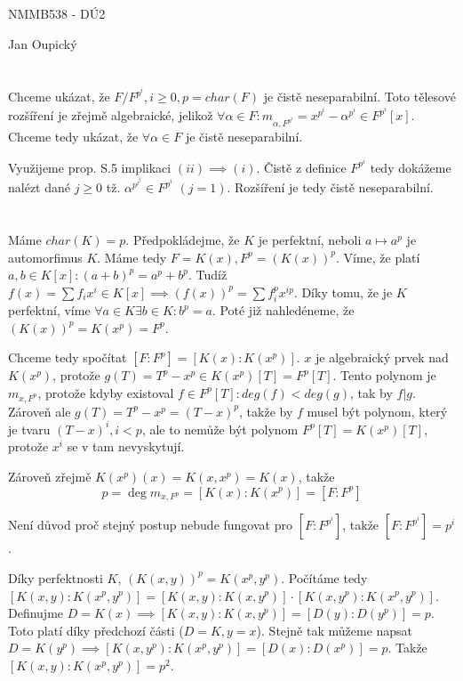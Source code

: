 \documentclass[12pt, a4paper]{article}
\begin{document}
\begin{center}
\large NMMB538 - DÚ2

\normalsize Jan Oupický
\end{center}
\vspace{1\baselineskip}

\section{}
Chceme ukázat, že $F/F^{p^i}, i \geq 0, p = char(F)$ je čistě neseparabilní. Toto tělesové rozšíření je zřejmě algebraické, jelikož $\forall \alpha \in F: m_{\alpha,F^{p^i}} = x^{p^i} - \alpha^{p^i} \in F^{p^i}[x]$. Chceme tedy ukázat, že $\forall \alpha \in F$ je čistě neseparabilní. 

Využijeme prop. S.5 implikaci $(ii) \implies (i)$. Čistě z definice $F^{p^i}$ tedy dokážeme nalézt dané $j \geq 0$ tž. $\alpha^{p^{i^{j}}} \in F^{p^i}$ $(j = 1)$. Rozšíření je tedy čistě neseparabilní.

\section{}
Máme $char(K) = p$. Předpokládejme, že $K$ je perfektní, neboli $a \mapsto a^p$ je automorfimus $K$. Máme tedy $F = K(x), F^p = (K(x))^p$. Víme, že platí $a,b \in K[x]: (a+b)^p = a^p + b^p$. Tudíž $f(x) = \sum f_ix^i \in K[x] \implies (f(x))^p = \sum f_i^p x^{ip}$. Díky tomu, že je $K$ perfektní, víme $\forall a \in K \exists b \in K: b^p = a$. Poté již nahledéneme, že $(K(x))^p = K(x^p) = F^p$.

Chceme tedy spočítat $[F:F^p]=[K(x):K(x^p)]$. $x$ je algebraický prvek nad $K(x^p)$, protože $g(T) = T^p - x^p \in K(x^p)[T] = F^p[T]$. Tento polynom je $m_{x,F^p}$, protože kdyby existoval $f \in F^p[T]: deg(f) < deg(g)$, tak by $f|g$. Zároveň ale $g(T)=T^p - x^p = (T-x)^p$, takže by $f$ musel být polynom, který je tvaru $(T-x)^i, i < p$, ale to nemůže být polynom $F^p[T]=K(x^p)[T]$, protože $x^i$ se v tam nevyskytují.

Zároveň zřejmě $K(x^p)(x)=K(x,x^p)=K(x)$, takže 
\[
p = \deg m_{x,F^p} = [K(x):K(x^p)] = [F:F^p]
\]

Není důvod proč stejný postup nebude fungovat pro $[F:F^{p^i}]$, takže $[F:F^{p^i}] = p^i$. 

Díky perfektnosti $K$, $(K(x,y))^p = K(x^p,y^p)$. Počítáme tedy $[K(x,y):K(x^p,y^p)] = [K(x,y):K(x,y^p)] \cdot [K(x,y^p):K(x^p,y^p)]$. Definujme $D= K(x) \implies [K(x,y):K(x,y^p)] = [D(y):D(y^p)] = p$. Toto platí díky předchozí části ($D = K, y=x$). Stejně tak můžeme napsat $D = K(y^p) \implies  [K(x,y^p):K(x^p,y^p)] = [D(x):D(x^p)]=p$. Takže $[K(x,y):K(x^p,y^p)] = p^2$.
\end{document}
